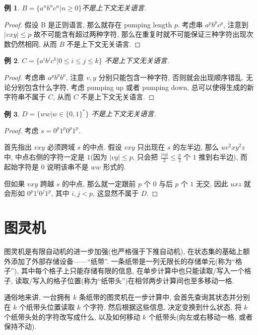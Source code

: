 \documentclass[8pt]{article}
\theoremstyle{compact}
\newtheorem{example}{例}[section]
\def\le{\leqslant}
\def\ge{\geqslant}
\begin{document}
\begin{example}
	$B = \{a^nb^nc^n | n \ge 0\}$不是上下文无关语言.
\end{example}
\begin{proof}
	假设 B 是正则语言, 那么就存在 pumping length $p$. 考虑串 $a^pb^pc^p$, 注意到 $|vxy| \le p$ 故不可能含有超过两种字符, 那么在重复时就不可能保证三种字符出现次数仍然相同, 从而 $B$ 不是上下文无关语言.
\end{proof}
\begin{example}
	$C = \{a^ib^jc^k | 0 \le i \le j \le k\}$ 不是上下文无关语言.
\end{example}
\begin{proof}
	考虑串 $a^{p}b^{p}b^{p}$, 注意 $v, y$ 分别只能包含一种字符, 否则就会出现顺序错乱. 无论分别包含什么字符, 考虑 pumping up 或者 pumping down, 总可以使得生成的新字符串不属于 $C$, 从而 $C$ 不是上下文无关语言.
\end{proof}
\begin{example}
	$D = \{ww | w \in \{0, 1\}^*\}$ 不是上下文无关语言. 
\end{example}
\begin{proof}
	考虑 $s = 0^p1^p0^p1^p$. 

	首先指出 $vxy$ 必须跨域 $s$ 的中点. 假设 $vxy$ 只出现在 $s$ 的左半边, 那么 $uv^2xy^2z$ 中, 中点右侧的字符一定是 $1$(因为 $|vy| \le p$, 只会把 $\frac{|vy|}{2} \le \frac p2$ 个 $1$ 推到右半边), 而起始字符是 $0$ 说明该串不是 $ww$ 形式的. 

	但如果 $vxy$ 跨越 $s$ 的中点, 那么就一定跟前 $p$ 个 $0$ 与后 $p$ 个 $1$ 无交, 因此 $uxz$ 就会形如 $0^p1^i0^j1^p$, 其中 $i, j < p$, 这显然不属于 $D$.
\end{proof}

\newpage
\section{图灵机}

图灵机是有限自动机的进一步加强(也严格强于下推自动机), 在状态集的基础上额外添加了外部存储设备——“纸带”. 一条纸带是一列无限长的存储单元(称为“格子”), 其中每个格子上只能存储有限的信息, 在单步计算中也只能读取/写入一个格子, 读取/写入的格子位置(称为“纸带头”)在相邻两步计算间也至多移动一格. 

通俗地来讲, 一台拥有 $k$ 条纸带的图灵机在一步计算中, 会首先查询其状态并分别在 $k$ 个纸带头位置读取 $k$ 个字符, 然后根据这些信息, 决定变换到什么状态, 将 $k$ 个纸带头处的字符改写成什么, 以及如何移动 $k$ 个纸带头(向左或右移动一格, 或者保持不动). 
\end{document}
